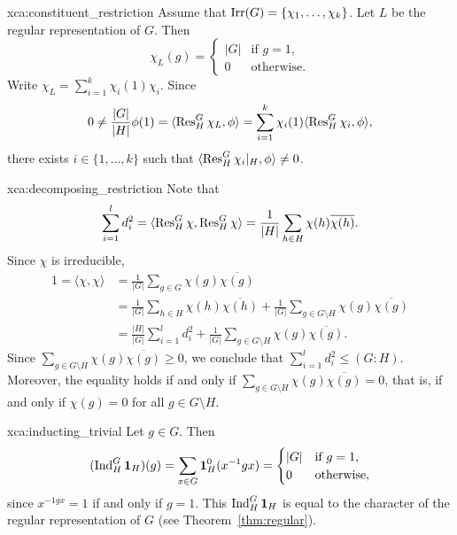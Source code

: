 \begin{sol}{xca:constituent_restriction}
    Assume that $\operatorname{Irr}(G)=\{\chi_1,\dots,\chi_k\}$. 
    Let $L$ be the regular representation of $G$. Then 
    \[
    \chi_L(g)=\begin{cases}
    |G| & \text{if $g=1$},\\
    0 & \text{otherwise}.
    \end{cases}
    \]
    Write $\chi_L=\sum_{i=1}^k\chi_i(1)\chi_i$. Since 
    \[
    0\ne \frac{|G|}{|H|}\phi(1)=\langle \operatorname{Res}_H^G\chi_L,\phi\rangle=\sum_{i=1}^k\chi_i(1)\langle\operatorname{Res}_H^G\chi_i,\phi\rangle,
    \]
    there exists $i\in\{1,\dots,k\}$ such that 
    $\langle\operatorname{Res}_H^G\chi_i|_H,\phi\rangle\ne 0$. 
\end{sol}

\begin{sol}{xca:decomposing_restriction}
Note that   
\[
\sum_{i=1}^ld_i^2=\langle\operatorname{Res}_H^G\chi,\operatorname{Res}_H^G\chi\rangle=\frac{1}{|H|}\sum_{h\in H}\chi(h)\overline{\chi(h)}.
\]
Since $\chi$ is irreducible, 
\begin{align*}
1=\langle\chi,\chi\rangle&=\frac{1}{|G|}\sum_{g\in G}\chi(g)\overline{\chi(g)}\\
&=\frac{1}{|G|}\sum_{h\in H}\chi(h)\overline{\chi(h)}
+\frac{1}{|G|}\sum_{g\in G\setminus H}\chi(g)\overline{\chi(g)}\\
&=\frac{|H|}{|G|}\sum_{i=1}^l d_i^2+\frac{1}{|G|}\sum_{g\in G\setminus H}\chi(g)\overline{\chi(g)}.
\end{align*}
Since $\sum_{g\in G\setminus H}\chi(g)\overline{\chi(g)}\geq0$, we conclude that $\sum_{i=1}^ld_i^2\leq(G:H)$. Moreover, the equality
holds if and only if $\sum_{g\in G\setminus H}\chi(g)\overline{\chi(g)}=0$, 
that is, if and only if $\chi(g)=0$ for all $g\in G\setminus H$.
\end{sol}


\begin{sol}{xca:inducting_trivial}
Let $g\in G$. Then 
\[
(\operatorname{Ind}_H^G\mathbf{1}_H)(g)=\sum_{x\in G}\mathbf{1}_H^0(x^{-1}gx)
=\begin{cases}
    |G| & \text{if $g=1$,}\\
    0 & \text{otherwise},
\end{cases}
\]
since $x^{-1gx}=1$ if and only if $g=1$. 
This $\operatorname{Ind}_H^G\mathbf{1}_H$ is equal to the character
of the regular representation of $G$ (see Theorem~\ref{thm:regular}). 
\end{sol}


